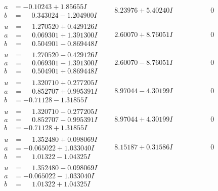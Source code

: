 \documentclass[1p]{elsarticle_modified}
\theoremstyle{definition}
\begin{document}
$$\begin{array}{c|c|c}
\begin{aligned}
a &= -0.10243 + 1.85655 I \\
b &= \phantom{-}0.343024 - 1.204900 I\end{aligned}
 & \phantom{-}8.23976 + 5.40240 I & \phantom{-0.000000 } 0 \\ \hline\begin{aligned}
u &= \phantom{-}1.270520 + 0.429126 I \\
a &= \phantom{-}0.069301 + 1.391300 I \\
b &= \phantom{-}0.504901 - 0.869448 I\end{aligned}
 & \phantom{-}2.60070 + 8.76051 I & \phantom{-0.000000 } 0 \\ \hline\begin{aligned}
u &= \phantom{-}1.270520 - 0.429126 I \\
a &= \phantom{-}0.069301 - 1.391300 I \\
b &= \phantom{-}0.504901 + 0.869448 I\end{aligned}
 & \phantom{-}2.60070 - 8.76051 I & \phantom{-0.000000 } 0 \\ \hline\begin{aligned}
u &= \phantom{-}1.320710 + 0.277205 I \\
a &= \phantom{-}0.852707 + 0.995391 I \\
b &= -0.71128 - 1.31855 I\end{aligned}
 & \phantom{-}8.97044 - 4.30199 I & \phantom{-0.000000 } 0 \\ \hline\begin{aligned}
u &= \phantom{-}1.320710 - 0.277205 I \\
a &= \phantom{-}0.852707 - 0.995391 I \\
b &= -0.71128 + 1.31855 I\end{aligned}
 & \phantom{-}8.97044 + 4.30199 I & \phantom{-0.000000 } 0 \\ \hline\begin{aligned}
u &= \phantom{-}1.352480 + 0.098069 I \\
a &= -0.065022 + 1.033040 I \\
b &= \phantom{-}1.01322 - 1.04325 I\end{aligned}
 & \phantom{-}8.15187 + 0.31586 I & \phantom{-0.000000 } 0 \\ \hline\begin{aligned}
u &= \phantom{-}1.352480 - 0.098069 I \\
a &= -0.065022 - 1.033040 I \\
b &= \phantom{-}1.01322 + 1.04325 I\end{aligned}

\end{array}$$
\end{document}
